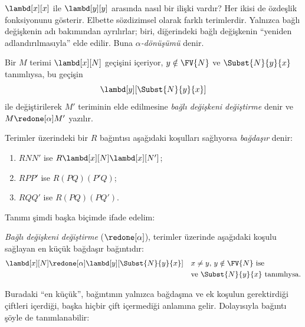 


$\lambd[x][x]$ ile $\lambd[y][y]$ arasında nasıl bir ilişki vardır? Her
ikisi de özdeşlik fonksiyonunu gösterir. Elbette sözdizimsel olarak farklı
terimlerdir. Yalnızca bağlı değişkenin adı bakımından ayrılırlar; biri,
diğerindeki bağlı değişkenin ``yeniden adlandırılmasıyla'' elde edilir. Buna
\emph{$\alpha$-dönüşümü} denir.

\begin{defn}
  Bir $M$ terimi $\lambd[x][N]$ geçişini içeriyor, $y\notin\FV{N}$ ve
  $\Subst{N}{y}{x}$ tanımlıysa, bu geçişin
  \begin{equation*}
    \lambd[y][\Subst{N}{y}{x}]
  \end{equation*}
  ile değiştirilerek $M'$ teriminin elde edilmesine \emph{bağlı değişkeni
  değiştirme} denir ve $M\redone[\alpha]M'$ yazılır.
\end{defn}

\begin{defn}
  Terimler üzerindeki bir $R$ bağıntısı aşağıdaki koşulları sağlıyorsa
  \emph{bağdaşır} denir:
  \begin{enumerate}
  \item $R N N'$ ise $R \lambd[x][N] \lambd[x][N']$;
  \item $R P P'$ ise $R (PQ) (P'Q)$;
  \item $R Q Q'$ ise $R (PQ) (PQ')$.
  \end{enumerate}
\end{defn}

Tanımı şimdi başka biçimde ifade edelim:
\begin{defn}
  \emph{Bağlı değişkeni değiştirme} ($\redone[\alpha]$), terimler üzerinde
  aşağıdaki koşulu sağlayan en küçük bağdaşır bağıntıdır:
  \begin{align*}
    &\lambd[x][N] \redone[\alpha] \lambd[y][\Subst{N}{y}{x}] && \text{$x
      \neq y$, $y \notin \FV{N}$ ise} \\
    & &&\text{ve $\Subst{N}{y}{x}$ tanımlıysa.}
  \end{align*}
\end{defn}

Buradaki ``en küçük'', bağıntının yalnızca bağdaşma ve ek koşulun
gerektirdiği çiftleri içerdiği, başka hiçbir çift içermediği anlamına gelir.
Dolayısıyla bağıntı şöyle de tanımlanabilir:

